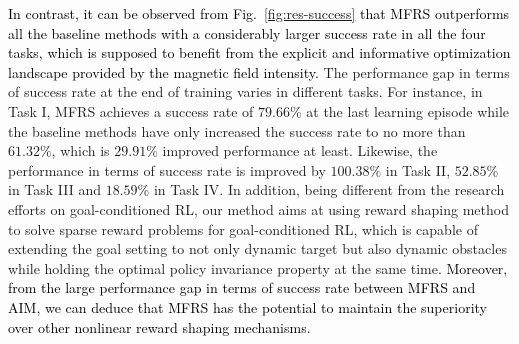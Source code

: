 \documentclass[journal]{IEEEtran}
\begin{document}
\textcolor{black}{In contrast, it can be observed from Fig.~\ref{fig:res-success} that MFRS outperforms all the baseline methods with a considerably larger success rate in all the four tasks, which is supposed to benefit from the explicit and informative optimization landscape provided by the magnetic field intensity.}
The performance gap in terms of success rate at the end of training varies in different tasks. For instance, in Task I, MFRS achieves a success rate of $79.66\%$ at the last learning episode while the baseline methods have only increased the success rate to no more than $61.32\%$, which is $29.91\%$ improved performance at least.
Likewise, the performance in terms of success rate is improved by $100.38\%$ in Task II, $52.85\%$ in Task III and $18.59\%$ in Task IV.
In addition, being different from the research efforts on goal-conditioned RL, our method aims at using reward shaping method to solve sparse reward problems for goal-conditioned RL, which is capable of extending the goal setting to not only dynamic target but also dynamic obstacles while holding the optimal policy invariance property at the same time.
\textcolor{black}{
Moreover, from the large performance gap in terms of success rate between MFRS and AIM, we can deduce that MFRS has the potential to maintain the superiority over other nonlinear reward shaping mechanisms.}
\end{document}
